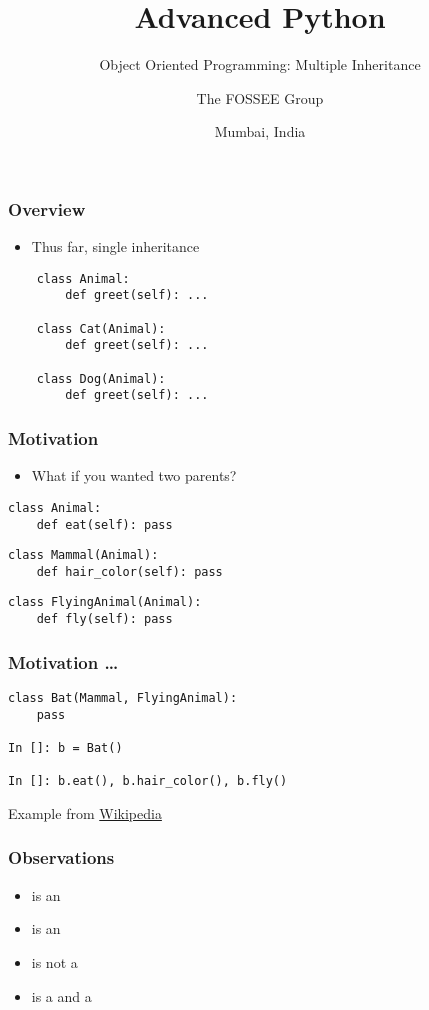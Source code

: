 \documentclass[14pt,compress,aspectratio=169]{beamer}
\title[OOP: multiple inheritance]{Advanced Python}
\subtitle{Object Oriented Programming: Multiple Inheritance}
\author[FOSSEE] {The FOSSEE Group}
\institute[IIT Bombay] {Department of Aerospace Engineering\\IIT Bombay}
\date[] {Mumbai, India}
\begin{document}
\begin{frame}
  \titlepage
\end{frame}

\begin{frame}[fragile]
  \frametitle{Overview}
  \begin{itemize}
  \item Thus far, single inheritance
  \end{itemize}
  \begin{lstlisting}
    class Animal:
        def greet(self): ...

    class Cat(Animal):
        def greet(self): ...

    class Dog(Animal):
        def greet(self): ...
\end{lstlisting}
\end{frame}

\begin{frame}[fragile]
  \frametitle{Motivation}
  \begin{itemize}
  \item What if you wanted two parents?
  \end{itemize}

\begin{lstlisting}
class Animal:
    def eat(self): pass
  \end{lstlisting}
  \pause
  \begin{lstlisting}
class Mammal(Animal):
    def hair_color(self): pass
  \end{lstlisting}
  \pause
\begin{lstlisting}
class FlyingAnimal(Animal):
    def fly(self): pass

\end{lstlisting}
\end{frame}

\begin{frame}[fragile]
  \frametitle{Motivation \ldots}
\begin{lstlisting}
class Bat(Mammal, FlyingAnimal):
    pass

In []: b = Bat()

In []: b.eat(), b.hair_color(), b.fly()
\end{lstlisting}
\vspace*{0.25in}
\footnotesize{Example from \href{https://en.wikipedia.org/wiki/Virtual_inheritance}{Wikipedia}}
\end{frame}


\begin{frame}
  \frametitle{Observations}
  \begin{itemize}
  \item {} is an 
  \item {} is an 
  \item {} is not a 
  \item {} is a  and a 
  \end{itemize}
\end{frame}
\end{document}
